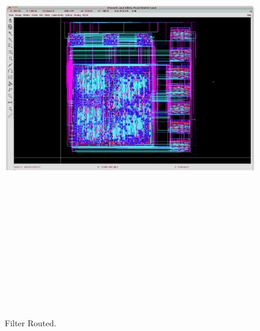 \begin{figure}[htbp]
\centering
\includegraphics[angle=90,height=8in]{images/FinalRouted}
\caption{Filter Routed.}
\label{fig:filterrouted}
\end{figure}





